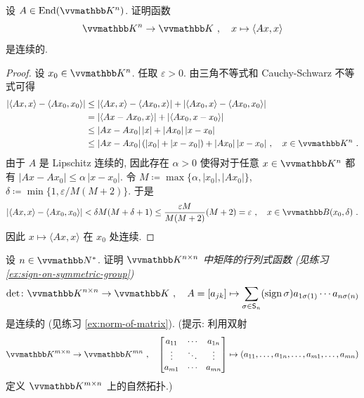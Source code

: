 \begin{exercise}
    设 \(A \in \End(\K^n)\). 证明函数
    \[
        \K^n \to \K\ ,\quad x \mapsto \langle A x, x \rangle
    \]
    是连续的.
\end{exercise}

\begin{proof}
    设 \(x_0 \in \K^n\). 任取 \(\varepsilon > 0\). 由三角不等式和 Cauchy-Schwarz 不等式可得
    \begin{align*}
        |\langle A x, x \rangle - \langle A x_0, x_0 \rangle| &\leq |\langle A x, x \rangle - \langle A x_0, x \rangle| + |\langle A x_0, x \rangle - \langle A x_0, x_0 \rangle|\\
        &= |\langle A x - A x_0, x \rangle| + |\langle A x_0, x - x_0 \rangle|\\
        &\leq |A x - A x_0|\, |x| + |A x_0|\, |x - x_0|\\
        &\leq |A x - A x_0|\, (|x_0| + |x - x_0|) + |A x_0|\, |x - x_0|\ ,\quad x \in \K^n\ .
    \end{align*}
    由于 \(A\) 是 Lipschitz 连续的, 因此存在 \(\alpha > 0\) 使得对于任意 \(x \in \K^n\) 都有 \(|A x - A x_0| \leq \alpha\, |x - x_0|\). 令 \(M \coloneqq \max\{\alpha, |x_0|, |A x_0|\}\), \(\delta \coloneqq \min \bigl\{1, \varepsilon / M (M + 2)\bigr\}\). 于是
    \[
        |\langle A x, x \rangle - \langle A x_0, x_0 \rangle| < \delta M (M + \delta + 1) \leq \frac{\varepsilon M}{M (M + 2)} (M + 2) = \varepsilon\ ,\quad x \in \B(x_0, \delta)\ .
    \]
    因此 \(x \mapsto \langle A x, x \rangle\) 在 \(x_0\) 处连续.
\end{proof}

\begin{exercise}
    设 \(n \in \N^\ast\). 证明 \textsl{\(\K^{n \times n}\) 中矩阵的行列式函数 (见练习 \ref{ex:sign-on-symmetric-group})
    \[
        \det \colon \K^{n \times n} \to \K\ ,\quad A = [a_{j k}] \mapsto \sum_{\sigma \in \mathsf S_n} (\sign \sigma) a_{1 \sigma(1)} \cdots a_{n \sigma(n)}
    \]
    } 是连续的 (见练习 \ref{ex:norm-of-matrix}). (提示: 利用双射
    \[
        \K^{m \times n} \to \K^{m n}\ ,\quad
        \begin{bmatrix}
            a_{1 1} & \cdots & a_{1 n} \\
            \vdots  & \ddots & \vdots  \\
            a_{m 1} & \cdots & a_{m n}
        \end{bmatrix}
        \mapsto (a_{1 1}, \ldots, a_{1 n}, \ldots, a_{m 1}, \ldots, a_{m n})
    \]
    定义 \(\K^{m \times n}\) 上的自然拓扑.)
\end{exercise}

